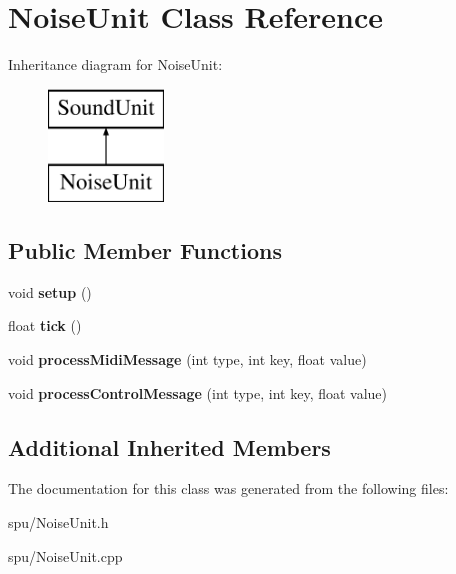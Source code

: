 \hypertarget{classNoiseUnit}{}\section{Noise\+Unit Class Reference}
\label{classNoiseUnit}
Inheritance diagram for Noise\+Unit\+:\begin{figure}[H]
\begin{center}
\leavevmode
\includegraphics[height=3.000000cm]{classNoiseUnit}
\end{center}
\end{figure}
\subsection*{Public Member Functions}
\begin{DoxyCompactItemize}
\item 
void {\bfseries setup} ()\hypertarget{classNoiseUnit_a81666e8bdea833fad6a4451a765c6b83}{}\label{classNoiseUnit_a81666e8bdea833fad6a4451a765c6b83}

\item 
float {\bfseries tick} ()\hypertarget{classNoiseUnit_af48a9a915f7f593105e8fe2d2ddb745a}{}\label{classNoiseUnit_af48a9a915f7f593105e8fe2d2ddb745a}

\item 
void {\bfseries process\+Midi\+Message} (int type, int key, float value)\hypertarget{classNoiseUnit_a58e18639dc527bb67184b38107bd6acf}{}\label{classNoiseUnit_a58e18639dc527bb67184b38107bd6acf}

\item 
void {\bfseries process\+Control\+Message} (int type, int key, float value)\hypertarget{classNoiseUnit_a755cc04254bf8ecba6082ea8d6151d6c}{}\label{classNoiseUnit_a755cc04254bf8ecba6082ea8d6151d6c}

\end{DoxyCompactItemize}
\subsection*{Additional Inherited Members}


The documentation for this class was generated from the following files\+:\begin{DoxyCompactItemize}
\item 
spu/Noise\+Unit.\+h\item 
spu/Noise\+Unit.\+cpp\end{DoxyCompactItemize}
